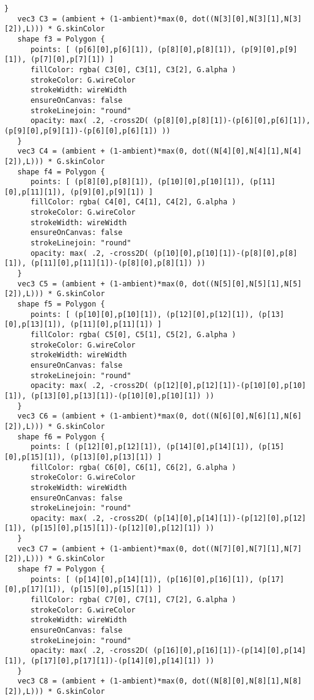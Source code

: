\begin{lstlisting}[language=Sty-RT,escapechar=@]
   }
   vec3 C3 = (ambient + (1-ambient)*max(0, dot((N[3][0],N[3][1],N[3][2]),L))) * G.skinColor
   shape f3 = Polygon {
      points: [ (p[6][0],p[6][1]), (p[8][0],p[8][1]), (p[9][0],p[9][1]), (p[7][0],p[7][1]) ]
      fillColor: rgba( C3[0], C3[1], C3[2], G.alpha )
      strokeColor: G.wireColor
      strokeWidth: wireWidth
      ensureOnCanvas: false
      strokeLinejoin: "round"
      opacity: max( .2, -cross2D( (p[8][0],p[8][1])-(p[6][0],p[6][1]), (p[9][0],p[9][1])-(p[6][0],p[6][1]) ))
   }
   vec3 C4 = (ambient + (1-ambient)*max(0, dot((N[4][0],N[4][1],N[4][2]),L))) * G.skinColor
   shape f4 = Polygon {
      points: [ (p[8][0],p[8][1]), (p[10][0],p[10][1]), (p[11][0],p[11][1]), (p[9][0],p[9][1]) ]
      fillColor: rgba( C4[0], C4[1], C4[2], G.alpha )
      strokeColor: G.wireColor
      strokeWidth: wireWidth
      ensureOnCanvas: false
      strokeLinejoin: "round"
      opacity: max( .2, -cross2D( (p[10][0],p[10][1])-(p[8][0],p[8][1]), (p[11][0],p[11][1])-(p[8][0],p[8][1]) ))
   }
   vec3 C5 = (ambient + (1-ambient)*max(0, dot((N[5][0],N[5][1],N[5][2]),L))) * G.skinColor
   shape f5 = Polygon {
      points: [ (p[10][0],p[10][1]), (p[12][0],p[12][1]), (p[13][0],p[13][1]), (p[11][0],p[11][1]) ]
      fillColor: rgba( C5[0], C5[1], C5[2], G.alpha )
      strokeColor: G.wireColor
      strokeWidth: wireWidth
      ensureOnCanvas: false
      strokeLinejoin: "round"
      opacity: max( .2, -cross2D( (p[12][0],p[12][1])-(p[10][0],p[10][1]), (p[13][0],p[13][1])-(p[10][0],p[10][1]) ))
   }
   vec3 C6 = (ambient + (1-ambient)*max(0, dot((N[6][0],N[6][1],N[6][2]),L))) * G.skinColor
   shape f6 = Polygon {
      points: [ (p[12][0],p[12][1]), (p[14][0],p[14][1]), (p[15][0],p[15][1]), (p[13][0],p[13][1]) ]
      fillColor: rgba( C6[0], C6[1], C6[2], G.alpha )
      strokeColor: G.wireColor
      strokeWidth: wireWidth
      ensureOnCanvas: false
      strokeLinejoin: "round"
      opacity: max( .2, -cross2D( (p[14][0],p[14][1])-(p[12][0],p[12][1]), (p[15][0],p[15][1])-(p[12][0],p[12][1]) ))
   }
   vec3 C7 = (ambient + (1-ambient)*max(0, dot((N[7][0],N[7][1],N[7][2]),L))) * G.skinColor
   shape f7 = Polygon {
      points: [ (p[14][0],p[14][1]), (p[16][0],p[16][1]), (p[17][0],p[17][1]), (p[15][0],p[15][1]) ]
      fillColor: rgba( C7[0], C7[1], C7[2], G.alpha )
      strokeColor: G.wireColor
      strokeWidth: wireWidth
      ensureOnCanvas: false
      strokeLinejoin: "round"
      opacity: max( .2, -cross2D( (p[16][0],p[16][1])-(p[14][0],p[14][1]), (p[17][0],p[17][1])-(p[14][0],p[14][1]) ))
   }
   vec3 C8 = (ambient + (1-ambient)*max(0, dot((N[8][0],N[8][1],N[8][2]),L))) * G.skinColor

\end{lstlisting}
